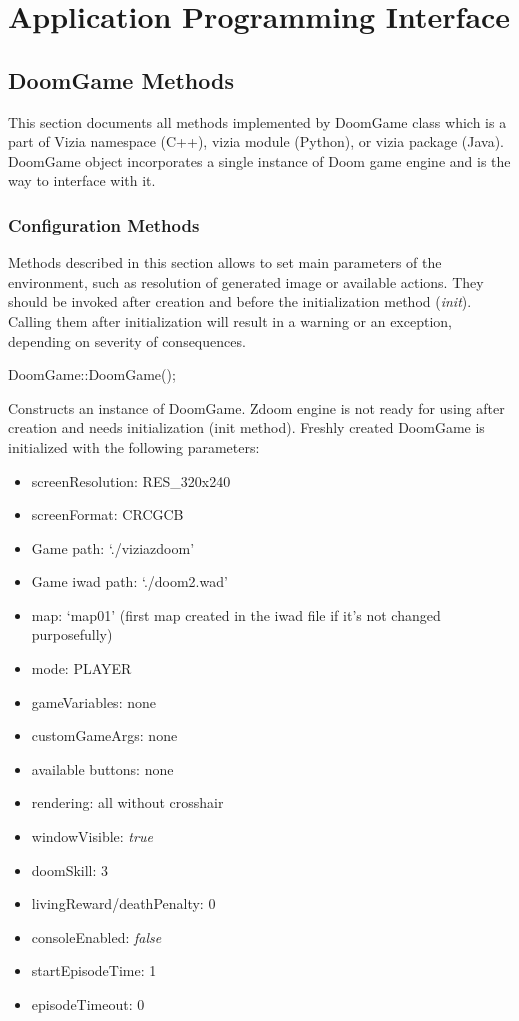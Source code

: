 \chapter{Application Programming Interface}\label{ch:api}
\section{DoomGame Methods}\label{sec:methods}
	This section documents all methods implemented by DoomGame class which is a part of Vizia namespace (C++), vizia module (Python), or vizia package (Java). DoomGame object incorporates a single instance of Doom game engine and is the way to interface with it.
	\subsection{Configuration Methods}\label{subsec:config_methods}
	Methods described in this section allows to set main parameters of the environment, such as resolution of generated image or available actions. They should be invoked after creation and before the initialization method (\emph{init}). Calling them after initialization will result in a warning or an exception, depending on severity of consequences. 
	\vspace{20pt}

\begin{clinee}
DoomGame::DoomGame();
\end{clinee}

	Constructs an instance of DoomGame. Zdoom engine is not ready for using after creation and needs initialization (init method). Freshly created DoomGame is initialized with the following parameters:
	\begin{itemize}
		\item screenResolution: RES\_320x240
		\item screenFormat: CRCGCB
		\item Game path: `./viziazdoom'
		\item Game iwad path: `./doom2.wad'
		\item map: `map01' (first map created in the iwad file if it's not changed purposefully)
		\item mode: PLAYER
		\item gameVariables: none
		\item customGameArgs: none
		\item available buttons: none
		\item rendering: all without crosshair
		\item windowVisible: \emph{true} 
		\item doomSkill: 3
		\item livingReward/deathPenalty: 0
		\item consoleEnabled: \emph{false}
		\item startEpisodeTime: 1
		\item episodeTimeout: 0
	\end{itemize}

